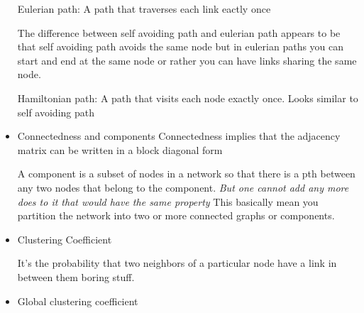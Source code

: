 \documentclass{article}
\begin{document}
\begin{itemize}
Eulerian path: A path that traverses each link eactly once 

The difference between self avoiding path and eulerian path appears to be that self avoiding path avoids the same node but in eulerian paths you can start and end at the same node or rather you can have links sharing the same node. 

Hamiltonian path: A path that visits each node exactly once. Looks similar to self avoiding path

\item Connectedness and components 
 Connectedness implies that the adjacency matrix can be written in a block diagonal form 

 A component is a subset of nodes in a network so that there is a pth between any two nodes that belong to the component. \textit{ But one cannot add any more does to it that would have the same property } This basically mean you partition the network into two or more connected graphs or components. 

\item Clustering Coefficient

	It's the probability that two neighbors of a particular node have a link in between them boring stuff. 


\item Global clustering coefficient 





\end{itemize}
\end{document}
